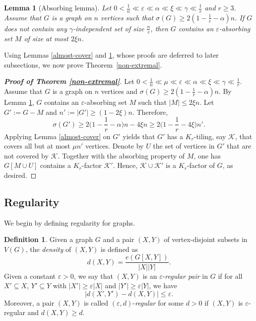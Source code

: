 \documentclass[11pt, a4paper]{article}
\newtheorem{lemma}[theorem]{Lemma}
\theoremstyle{definition}
\newtheorem{definition}[theorem]{Definition}
\newcommand{\eps}{\varepsilon}
\newcommand{\<}{\subseteq}
\begin{document}
\begin{lemma}[Absorbing lemma]\label{absorbing}
    Let $0<\frac{1}{n}\ll \eps\ll \alpha\ll \xi\ll \gamma\ll \frac{1}{r}$ and $r\ge 3$. Assume that $G$ is a graph on $n$ vertices such that $\sigma(G)\geq 2(1-\frac{1}{r}-\alpha)n$. If $G$ does not contain any $\gamma$-independent set of size $\frac{n}{r}$, then $G$ contains an  $\eps$-absorbing set $M$ of size at most $2\xi n$. %
\end{lemma}
Using Lemmas \ref{almost-cover} and \ref{absorbing}, whose proofs are deferred to later subsections, we now prove Theorem~\ref{non-extremal}.
\begin{proof}[\bf Proof of Theorem \ref{non-extremal}]
    Let $0<\frac{1}{n}\ll \mu\ll\eps\ll\alpha\ll \xi\ll \gamma\ll \frac{1}{r}$. Assume that $G$ is a graph on $n$ vertices and $\sigma(G)\geq 2(1-\frac{1}{r}-\alpha)n$. By Lemma \ref{absorbing}, $G$ contains an $\eps$-absorbing set $M$ such that $|M|\leq 2\xi n$. %
    Let $G':=G-M$ and $n':=|G'|\geq (1-2\xi)n$. Therefore, 
    $$
    \sigma(G')\geq 2\Big(1-\frac{1}{r}-\alpha\Big)n-4\xi n\geq 2\Big(1-\frac{1}{r}-4\xi\Big)n'. 
    $$
    Applying Lemma \ref{almost-cover} on $G'$ yields that $G'$ has a $K_r$-tiling, say $\mathcal{K}$, that covers all but at most $\mu n'$ vertices. Denote by $U$ the set of vertices in $G'$ that are not covered by $\mathcal{K}$.  Together with the absorbing property of $M$, one has $G[M\cup U]$ contains a $K_r$-factor $\mathcal{K}'$. Hence, $\mathcal{K}\cup \mathcal{K}'$ is a $K_r$-factor of $G$, as desired. 
\end{proof}

\subsection{Regularity}
We begin by defining regularity for graphs.
\begin{definition}
  Given a graph $G$ and a pair $(X,Y)$ of vertex-disjoint subsets in $V(G)$, the \textit{density} of $(X,Y)$ is defined as 
  $$
  d(X,Y)=\frac{e(G[X,Y])}{|X||Y|}.
  $$
  Given a constant $\eps>0$, we say that $(X,Y)$ is an $\eps$-\textit{regular pair} in $G$ if for all $X'\subseteq X$, $Y'\subseteq Y$ with $|X'|\geq \eps |X|$ and $|Y'|\geq \eps |Y|$, we have 
        $$
          \left|d(X',Y')-d(X,Y)\right|\leq \eps.
        $$
Moreover, a pair $(X,Y)$ is called $(\eps,d)$-\textit{regular} for some $d>0$ if $(X,Y)$ is $\eps$-regular and $d(X,Y)\geq d$. 
\end{definition}
\end{document}
